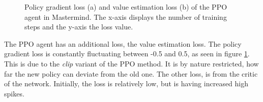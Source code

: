 \begin{figure}[H]
	\centering
	\qquad
	\caption[PPO loss]{Policy gradient loss (a) and value estimation loss (b) of the PPO agent in Mastermind. The x-axis displays the number of training steps and the y-axis the loss value.}	
	\label{fig:ppo_loss}
\end{figure}


The PPO agent has an additional loss, the value estimation loss. The policy gradient loss is constantly fluctuating between -0.5 and 0.5, as seen in figure \ref{fig:ppo_loss}. This is due to the \textit{clip} variant of the PPO method. It is by nature restricted, how far the new policy can deviate from the old one. The other loss, is from the critic of the network. Initially, the loss is relatively low, but is having increased high spikes.


